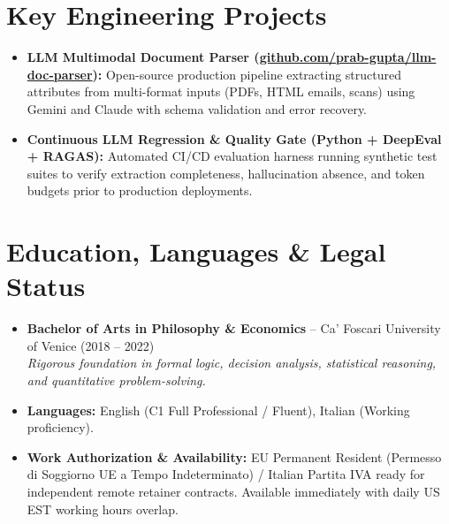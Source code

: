 \documentclass[a4paper,10pt]{article}
\begin{document}
\section{Key Engineering Projects}
\begin{itemize}
  \item \textbf{LLM Multimodal Document Parser (\href{https://github.com/prab-gupta/llm-doc-parser}{github.com/prab-gupta/llm-doc-parser}):} Open-source production pipeline extracting structured attributes from multi-format inputs (PDFs, HTML emails, scans) using Gemini and Claude with schema validation and error recovery.
  \item \textbf{Continuous LLM Regression \& Quality Gate (Python + DeepEval + RAGAS):} Automated CI/CD evaluation harness running synthetic test suites to verify extraction completeness, hallucination absence, and token budgets prior to production deployments.
\end{itemize}

\section{Education, Languages \& Legal Status}
\begin{itemize}
  \item \textbf{Bachelor of Arts in Philosophy \& Economics} -- Ca' Foscari University of Venice (2018 -- 2022) \\
  \textit{Rigorous foundation in formal logic, decision analysis, statistical reasoning, and quantitative problem-solving.}
  \item \textbf{Languages:} English (C1 Full Professional / Fluent), Italian (Working proficiency).
  \item \textbf{Work Authorization \& Availability:} EU Permanent Resident (Permesso di Soggiorno UE a Tempo Indeterminato) / Italian Partita IVA ready for independent remote retainer contracts. Available immediately with daily US EST working hours overlap.
\end{itemize}
\end{document}
